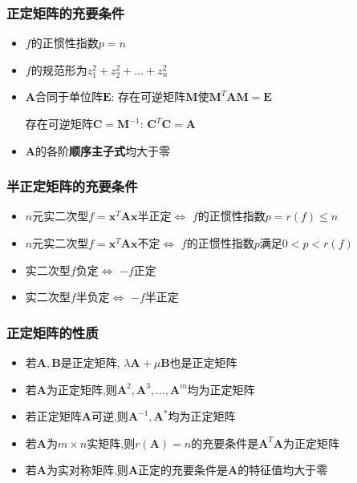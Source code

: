 \documentclass{article}
\begin{document}
				\subsubsection*{正定矩阵的充要条件}
				\begin{itemize}
					\item $f$的正惯性指数$p=n$
					\item $f$的规范形为$z_1^2+z_2^2+\dots +z_n^2$
					\item $\boldsymbol A$合同于单位阵$\boldsymbol E$: 存在可逆矩阵$\boldsymbol M$使$\boldsymbol M^T\boldsymbol A\boldsymbol M=\boldsymbol E$

					存在可逆矩阵$\boldsymbol C=\boldsymbol M^{-1}$: $\boldsymbol C^T\boldsymbol C=\boldsymbol A$
					\item $\boldsymbol A$的各阶\textbf{顺序主子式}均大于零
				\end{itemize}
				\subsubsection*{半正定矩阵的充要条件}
					\begin{itemize}
						\item $n$元实二次型$f=\boldsymbol x^T\boldsymbol A\boldsymbol x$半正定$\Leftrightarrow$ $f$的正惯性指数$p=r(f)\leqslant n$
						\item $n$元实二次型$f=\boldsymbol x^T\boldsymbol A\boldsymbol x$不定$\Leftrightarrow$ $f$的正惯性指数$p$满足$0<p<r(f)$
						\item 实二次型$f$负定$\Leftrightarrow$ $-f$正定
						\item 实二次型$f$半负定$\Leftrightarrow$ $-f$半正定
					\end{itemize}
				\subsubsection*{正定矩阵的性质}
					\begin{itemize}
						\item 若$\boldsymbol{A}, \boldsymbol{B}$是正定矩阵, $\lambda\boldsymbol{A}+\mu\boldsymbol{B}$也是正定矩阵
						\item 若$\boldsymbol A$为正定矩阵,则$\boldsymbol A^2,\boldsymbol A^3,\dots ,\boldsymbol A^m$均为正定矩阵
						\item 若正定矩阵$\boldsymbol A$可逆,则$\boldsymbol A^{-1},\boldsymbol A^*$均为正定矩阵
						\item 若$\boldsymbol A$为$m\times n$实矩阵,则$r(\boldsymbol A)=n$的充要条件是$\boldsymbol A^T\boldsymbol A$为正定矩阵
						\item 若$\boldsymbol A$为实对称矩阵,则$\boldsymbol A$正定的充要条件是$\boldsymbol A$的特征值均大于零
					\end{itemize}
\end{document}
